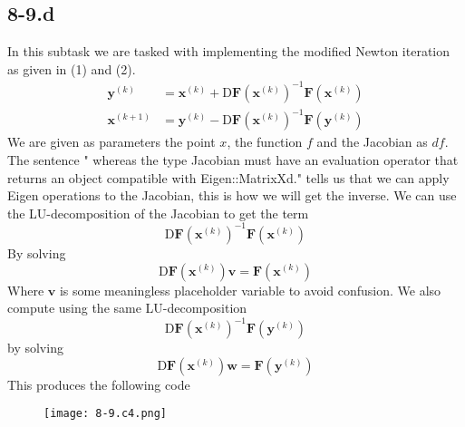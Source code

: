 \documentclass{article}
\newcommand\xk{\mathbf{x}^{\left(k\right)}}
\newcommand\xkn{\mathbf{x}^{\left(k+1\right)}}
\newcommand\yk{\mathbf{y}^{\left(k\right)}}
\begin{document}
\subsection*{8-9.d} 
In this subtask we are tasked with implementing the modified Newton iteration as given in (1) and (2).
\begin{align}
    \yk &= \xk + \mathrm{D}\mathbf{F}\left(\xk\right)^{-1} \mathbf{F}\left(\xk\right) \\
    \xkn &= \yk - \mathrm{D}\mathbf{F}\left(\xk\right)^{-1} \mathbf{F}\left(\yk\right)
\end{align}
We are given as parameters the point $x$, the function $f$ and the Jacobian as $df$. The sentence " whereas the type Jacobian must have
an evaluation operator that returns an object compatible with Eigen::MatrixXd." tells us that we can apply Eigen operations to the Jacobian, this is how we will get the inverse. We can use the LU-decomposition of the Jacobian to get the term
\begin{equation*}
\mathrm{D}\mathbf{F}\left(\xk\right)^{-1} \mathbf{F}\left(\xk\right)
\end{equation*}
By solving 
\begin{equation*}
       \mathrm{D}\mathbf{F}\left(\xk\right)\mathbf{v} = \mathbf{F}\left(\xk\right)
\end{equation*}
Where $\mathbf{v}$ is some meaningless placeholder variable to avoid confusion. We also compute using the same LU-decomposition 
\begin{equation*}
    \mathrm{D}\mathbf{F}\left(\xk\right)^{-1} \mathbf{F}\left(\yk\right)
\end{equation*}
by solving 
\begin{equation*}
       \mathrm{D}\mathbf{F}\left(\xk\right)\mathbf{w} = \mathbf{F}\left(\yk\right)
\end{equation*}
This produces the following code
\begin{figure}[!hbt]
    \centering
    \texttt{[image: 8-9.c4.png]}
\end{figure}
\end{document}
